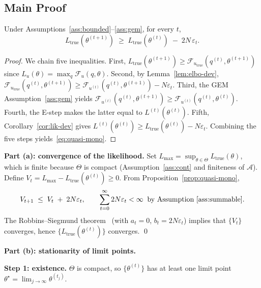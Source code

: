 \subsection{Main Proof}

\begin{proposition}
\label{prop:quasi-mono}
Under Assumptions~\ref{ass:bounded}--\ref{ass:gem}, for every $t$,
\begin{equation}
\label{eq:quasi-mono}
L_{\mathrm{true}}(\theta^{(t+1)}) \;\geq\;
L_{\mathrm{true}}(\theta^{(t)}) \;-\; 2N\,\varepsilon_t.
\end{equation}
\end{proposition}

\begin{proof}
We chain five inequalities. First,
$L_{\mathrm{true}}(\theta^{(t+1)}) \geq
\mathcal{F}_{u_{\mathrm{true}}}(q^{(t)}, \theta^{(t+1)})$ since
$L_u(\theta) = \max_q \mathcal{F}_u(q,\theta)$. Second, by
Lemma~\ref{lem:elbo-dev},
$\mathcal{F}_{u_{\mathrm{true}}}(q^{(t)}, \theta^{(t+1)})
\geq \mathcal{F}_{u^{(t)}}(q^{(t)}, \theta^{(t+1)}) - N\varepsilon_t$.
Third, the GEM Assumption~\ref{ass:gem} yields
$\mathcal{F}_{u^{(t)}}(q^{(t)}, \theta^{(t+1)})
\geq \mathcal{F}_{u^{(t)}}(q^{(t)}, \theta^{(t)})$. Fourth, the
E-step makes the latter equal to $L^{(t)}(\theta^{(t)})$. Fifth,
Corollary~\ref{cor:lik-dev} gives $L^{(t)}(\theta^{(t)}) \geq
L_{\mathrm{true}}(\theta^{(t)}) - N\varepsilon_t$. Combining the
five steps yields~\eqref{eq:quasi-mono}.
\end{proof}

\textbf{Part (a): convergence of the likelihood.}
Set $L_{\max} = \sup_{\theta\in\Theta} L_{\mathrm{true}}(\theta)$,
which is finite because $\Theta$ is compact (Assumption~\ref{ass:cont}
and finiteness of $\mathcal{A}$). Define
$V_t = L_{\max} - L_{\mathrm{true}}(\theta^{(t)}) \geq 0$. From
Proposition~\ref{prop:quasi-mono},
\begin{equation*}
V_{t+1} \;\leq\; V_t \;+\; 2N\varepsilon_t,
\qquad \sum_{t=0}^{\infty} 2N\varepsilon_t < \infty
\;\;\text{by Assumption~\ref{ass:summable}.}
\end{equation*}
The Robbins--Siegmund theorem~\cite{robbins1971convergence} (with
$a_t = 0$, $b_t = 2N\varepsilon_t$) implies that $\{V_t\}$ converges,
hence $\{L_{\mathrm{true}}(\theta^{(t)})\}$ converges. \qed

\textbf{Part (b): stationarity of limit points.}

\textbf{Step 1: existence.} $\Theta$ is compact, so
$\{\theta^{(t)}\}$ has at least one limit point
$\theta^{\star} = \lim_{j\to\infty} \theta^{(t_j)}$.

